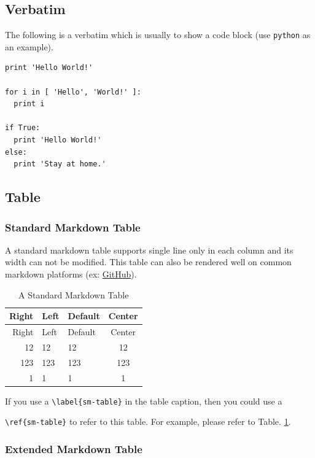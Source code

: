\documentclass[10pt, a4paper, oneside]{article}
\begin{document}
\subsection{Verbatim}\label{verbatim}

The following is a verbatim which is usually to show a code block (use \texttt{python} as an example).

\begin{verbatim}
print 'Hello World!'

for i in [ 'Hello', 'World!' ]:
  print i

if True:
  print 'Hello World!'
else:
  print 'Stay at home.'
\end{verbatim}

\clearpage

\subsection{Table}\label{table}

\subsubsection{Standard Markdown Table}\label{standard-markdown-table}

A standard markdown table supports single line only in each column and its width can not be modified.
This table can also be rendered well on common markdown platforms (ex: \href{https://github.com/}{GitHub}).

\begin{longtable}[c]{@{}rllc@{}}
\caption{A Standard Markdown Table \label{sm-table}}\tabularnewline
\toprule
Right & Left & Default & Center\tabularnewline
\midrule
\endfirsthead
\toprule
Right & Left & Default & Center\tabularnewline
\midrule
\endhead
12 & 12 & 12 & 12\tabularnewline
123 & 123 & 123 & 123\tabularnewline
1 & 1 & 1 & 1\tabularnewline
\bottomrule
\end{longtable}

If you use a \texttt{\textbackslash{}label\{sm-table\}} in the table caption, then you could use a

\texttt{\textbackslash{}ref\{sm-table\}} to refer to this table.
For example, please refer to Table. \ref{sm-table}.

\subsubsection{Extended Markdown Table}\label{extended-markdown-table}
\end{document}
